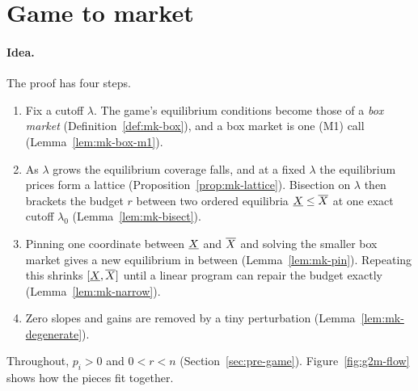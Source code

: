 \section{Game to market}\label{sec:mk-g2m}

\paragraph{Idea.} The proof has four steps.
\begin{enumerate}[nosep]
\item Fix a cutoff $\lambda$. The game's equilibrium conditions become those of a \emph{box market}
(Definition~\ref{def:mk-box}), and a box market is one (M1) call (Lemma~\ref{lem:mk-box-m1}).
\item As $\lambda$ grows the equilibrium coverage falls, and at a fixed $\lambda$ the equilibrium prices
form a lattice (Proposition~\ref{prop:mk-lattice}). Bisection on $\lambda$ then brackets the budget $r$
between two ordered equilibria $\underline{X}{}\le \overline{X}{}$ at one exact cutoff $\lambda_0$ (Lemma~\ref{lem:mk-bisect}).
\item Pinning one coordinate between $\underline{X}{}$ and $\overline{X}{}$ and solving the smaller box market gives a new
equilibrium in between (Lemma~\ref{lem:mk-pin}). Repeating this shrinks $[\underline{X}{},\overline{X}{}]$ until a linear program
can repair the budget exactly (Lemma~\ref{lem:mk-narrow}).
\item Zero slopes and gains are removed by a tiny perturbation (Lemma~\ref{lem:mk-degenerate}).
\end{enumerate}
Throughout, $p_i>0$ and $0<r<n$ (Section~\ref{sec:pre-game}).
Figure~\ref{fig:g2m-flow} shows how the pieces fit together.


